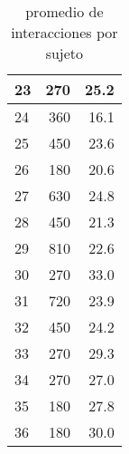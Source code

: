 \documentclass[spanish]{article}
\begin{document}
\begin{table}[h!]
\begin{center}
\begin{tabular}{|l|r|r|}
    23 &              270 &                      25.2\\ \hline
    24 &              360 &                      16.1\\ \hline
    25 &              450 &                      23.6\\ \hline
    26 &              180 &                      20.6\\ \hline
    27 &              630 &                      24.8\\ \hline
    28 &              450 &                      21.3\\ \hline
    29 &              810 &                      22.6\\ \hline
    30 &              270 &                      33.0\\ \hline
    31 &              720 &                      23.9\\ \hline
    32 &              450 &                      24.2\\ \hline
    33 &              270 &                      29.3\\ \hline
    34 &              270 &                      27.0\\ \hline
    35 &              180 &                      27.8\\ \hline
    36 &              180 &                      30.0\\ \hline
\end{tabular}
\caption{promedio de interacciones por sujeto}
\end{center}
\end{table}
\end{document}
